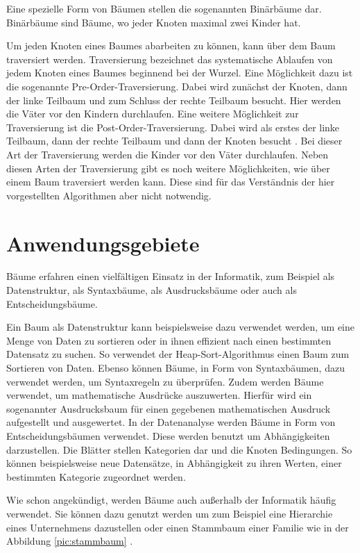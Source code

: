 Eine spezielle Form von Bäumen stellen die sogenannten Binärbäume dar. 
Binärbäume sind Bäume, wo jeder Knoten maximal zwei Kinder hat.

Um jeden Knoten eines Baumes abarbeiten zu können, kann über dem Baum 
traversiert werden. Traversierung bezeichnet das systematische Ablaufen 
von jedem Knoten eines Baumes beginnend bei der Wurzel. Eine Möglichkeit dazu ist die sogenannte
Pre-Order-Traversierung. Dabei wird zunächst der Knoten, dann der linke Teilbaum
und zum Schluss der rechte Teilbaum besucht. Hier werden die Väter vor den
Kindern durchlaufen. Eine weitere Möglichkeit zur Traversierung ist die 
Post-Order-Traversierung. Dabei wird als erstes der linke Teilbaum, dann der 
rechte Teilbaum und dann der Knoten besucht \cite[]{q4}. Bei dieser Art der 
Traversierung werden die Kinder vor den Väter durchlaufen. Neben diesen Arten
der Traversierung gibt es noch weitere Möglichkeiten, wie über einem 
Baum traversiert werden kann. Diese sind für das Verständnis der hier 
vorgestellten Algorithmen aber nicht notwendig.


\section{Anwendungsgebiete}

Bäume erfahren einen vielfältigen Einsatz in der Informatik, zum Beispiel 
als Datenstruktur, als Syntaxbäume, als Ausdrucksbäume oder auch als 
Entscheidungsbäume.

Ein Baum als Datenstruktur kann beispielsweise dazu verwendet werden, 
um eine Menge von Daten zu sortieren oder in ihnen effizient nach einen 
bestimmten Datensatz zu suchen. So verwendet der Heap-Sort-Algorithmus 
einen Baum zum Sortieren von Daten. Ebenso können Bäume, in Form von Syntaxbäumen, dazu verwendet 
werden, um Syntaxregeln zu überprüfen. Zudem werden Bäume verwendet, um mathematische 
Ausdrücke auszuwerten. Hierfür wird ein sogenannter Ausdrucksbaum für einen 
gegebenen mathematischen Ausdruck aufgestellt und ausgewertet. In der 
Datenanalyse werden Bäume in Form von Entscheidungsbäumen verwendet. 
Diese werden benutzt um Abhängigkeiten darzustellen. Die Blätter stellen 
Kategorien dar und die Knoten Bedingungen. So können beispielsweise neue 
Datensätze, in Abhängigkeit zu ihren Werten, einer bestimmten Kategorie 
zugeordnet werden.

Wie schon angekündigt, werden Bäume auch außerhalb der Informatik häufig verwendet. Sie können 
dazu genutzt werden um zum Beispiel eine Hierarchie eines Unternehmens
dazustellen oder einen Stammbaum einer 
Familie wie in der Abbildung \ref{pic:stammbaum} \cite[]{q4}.

